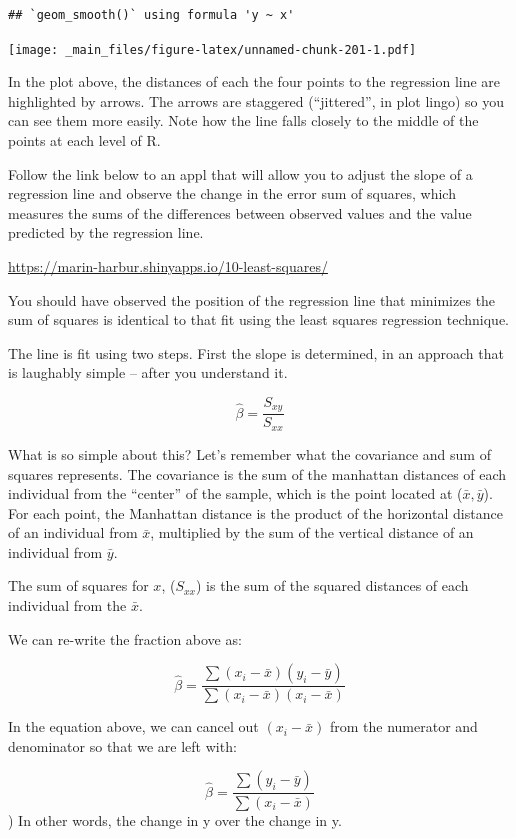\documentclass[
]{book}
\begin{document}
\begin{verbatim}
## `geom_smooth()` using formula 'y ~ x'
\end{verbatim}

\texttt{[image: \_main\_files/figure-latex/unnamed-chunk-201-1.pdf]}

In the plot above, the distances of each the four points to the regression line are highlighted by arrows. The arrows are staggered (``jittered'', in plot lingo) so you can see them more easily. Note how the line falls closely to the middle of the points at each level of R.

Follow the link below to an appl that will allow you to adjust the slope of a regression line and observe the change in the error sum of squares, which measures the sums of the differences between observed values and the value predicted by the regression line.

\url{https://marin-harbur.shinyapps.io/10-least-squares/}

You should have observed the position of the regression line that minimizes the sum of squares is identical to that fit using the least squares regression technique.

The line is fit using two steps. First the slope is determined, in an approach that is laughably simple -- after you understand it.

\[\hat{\beta} = \frac{S_{xy}}{S_{xx}}\]

What is so simple about this? Let's remember what the covariance and sum of squares represents. The covariance is the sum of the manhattan distances of each individual from the ``center'' of the sample, which is the point located at (\(\bar{x}, \bar{y}\)). For each point, the Manhattan distance is the product of the horizontal distance of an individual from \(\bar{x}\), multiplied by the sum of the vertical distance of an individual from \(\bar{y}\).

The sum of squares for \(x\), (\(S_{xx}\)) is the sum of the squared distances of each individual from the \(\bar{x}\).

We can re-write the fraction above as:

\[\hat{\beta} = \frac{\sum{(x_i - \bar{x})(y_i - \bar{y})}}{\sum(x_i - \bar{x})(x_i - \bar{x})} \]

In the equation above, we can cancel out \((x_i - \bar{x})\) from the numerator and denominator so that we are left with:

\[\hat{\beta} = \frac{\sum{(y_i - \bar{y})}}{\sum(x_i - \bar{x})} \]
)
In other words, the change in y over the change in y.
\end{document}
